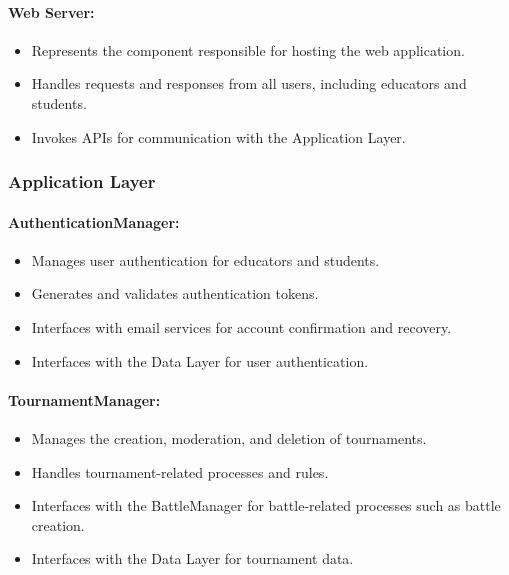\documentclass{article}
\begin{document}
\paragraph{Web Server:}

\begin{itemize}
    \item Represents the component responsible for hosting the web application.
    \item Handles requests and responses from all users, including educators and students.
    \item Invokes APIs for communication with the Application Layer.
\end{itemize}

\subsubsection{Application Layer}

\paragraph{AuthenticationManager:}

\begin{itemize}
    \item Manages user authentication for educators and students.
    \item Generates and validates authentication tokens.
    \item Interfaces with email services for account confirmation and recovery.
    \item Interfaces with the Data Layer for user authentication.
\end{itemize}

\paragraph{TournamentManager:}

\begin{itemize}
    \item Manages the creation, moderation, and deletion of tournaments.
    \item Handles tournament-related processes and rules.
    \item Interfaces with the BattleManager for battle-related processes such as battle creation.
    \item Interfaces with the Data Layer for tournament data.
\end{itemize}
\end{document}
